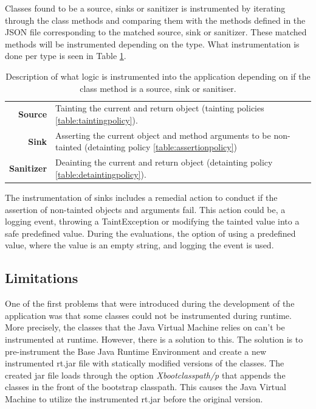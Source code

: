 Classes found to be a source, sinks or sanitizer is instrumented by iterating through the class methods and comparing them with the methods defined in the JSON file corresponding to the matched source, sink or sanitizer. These matched methods will be instrumented depending on the type. What instrumentation is done per type is seen in Table \ref{table:instru}. 

\begin{table}[H]
    \centering
    \caption{Description of what logic is instrumented into the application depending on if the class method is a source, sink or sanitiser.}
    \label{table:instru}
    \begin{tabular}{rp{9.5cm}}
        \textbf{Source} & Tainting the current and return object (tainting policies \ref{table:taintingpolicy}). \\
        \textbf{Sink} & Asserting the current object and method arguments to be non-tainted (detainting policy \ref{table:assertionpolicy}) \\
        \textbf{Sanitizer} & Deainting the current and return object (detainting policy \ref{table:detaintingpolicy}). \\
    \end{tabular}
\end{table}

The instrumentation of sinks includes a remedial action to conduct if the assertion of non-tainted objects and arguments fail. This action could be, a logging event, throwing a TaintException or modifying the tainted value into a safe predefined value. During the evaluations, the option of using a predefined value, where the value is an empty string, and logging the event is used.



\subsection{Limitations}
\label{NotableProblems}
One of the first problems that were introduced during the development of the application was that some classes could not be instrumented during runtime. More precisely, the classes that the Java Virtual Machine relies on can't be instrumented at runtime. However, there is a solution to this. The solution is to pre-instrument the Base Java Runtime Environment and create a new instrumented rt.jar file with statically modified versions of the classes. The created jar file loads through the option \textit{Xbootclasspath/p} \parencite{xboot} that appends the classes in the front of the bootstrap classpath. This causes the Java Virtual Machine to utilize the instrumented rt.jar before the original version.

